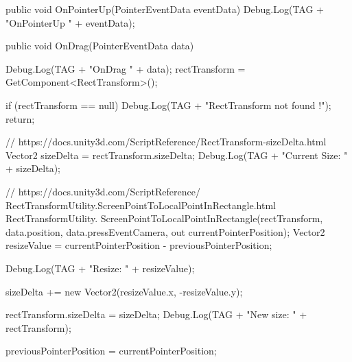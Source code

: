 \documentclass[a4paper,10pt]{article}
\newenvironment{solution}%
{\begin{tcolorbox}[breakable,colback=red!5!white,colframe=red!75!black,title=Solution]}%
{\end{tcolorbox}}
\newenvironment{boxcode}%
{\begin{tcolorbox}[breakable,colback=gray!5!white,colframe=black]}%
	{\end{tcolorbox}}
\begin{document}
\begin{enumerate}
\begin{solution}
\begin{boxcode}
\begin{csharpsansbord}
{	public void OnPointerUp(PointerEventData eventData) {
		Debug.Log(TAG + "OnPointerUp " + eventData);
	}
	
	public void OnDrag(PointerEventData data) {
		Debug.Log(TAG + "OnDrag " + data);
		rectTransform = GetComponent<RectTransform>();
		
		if (rectTransform == null) {
			Debug.Log(TAG + "RectTransform not found !");
			return;
		}
		
// https://docs.unity3d.com/ScriptReference/RectTransform-sizeDelta.html
		Vector2 sizeDelta = rectTransform.sizeDelta;
		Debug.Log(TAG + "Current Size: " + sizeDelta);
		
// https://docs.unity3d.com/ScriptReference/
RectTransformUtility.ScreenPointToLocalPointInRectangle.html
		RectTransformUtility.
		ScreenPointToLocalPointInRectangle(rectTransform,
			data.position,
			data.pressEventCamera,
			out currentPointerPosition);
		Vector2 resizeValue = currentPointerPosition - previousPointerPosition;
		
		Debug.Log(TAG + "Resize: " + resizeValue);
		
		sizeDelta += new Vector2(resizeValue.x, -resizeValue.y);
		
		rectTransform.sizeDelta = sizeDelta;
		Debug.Log(TAG + "New size: " + rectTransform);
		
		previousPointerPosition = currentPointerPosition;
	}
}	
\end{csharpsansbord}
\end{boxcode}

\end{solution}	
\fi 

	
\end{enumerate}
\end{document}
